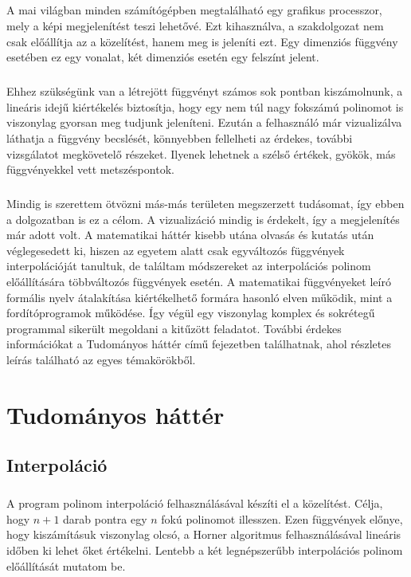 \documentclass{elteikthesis}
\begin{document}
\paragraph{}
A mai világban minden számítógépben megtalálható egy grafikus processzor, mely a képi megjelenítést teszi lehetővé. Ezt kihasználva, a szakdolgozat nem csak előállítja az a közelítést, hanem meg is jeleníti ezt. Egy dimenziós függvény esetében ez egy vonalat, két dimenziós esetén egy felszínt jelent.
\paragraph{}
Ehhez szükségünk van a létrejött függvényt számos sok pontban kiszámolnunk, a lineáris idejű kiértékelés biztosítja, hogy egy nem túl nagy fokszámú polinomot is viszonylag gyorsan meg tudjunk jeleníteni. Ezután a felhasználó már vizualizálva láthatja a függvény becslését, könnyebben fellelheti az érdekes, további vizsgálatot megkövetelő részeket. Ilyenek lehetnek a szélső értékek, gyökök, más függvényekkel vett metszéspontok.
\paragraph{}
Mindig is szerettem ötvözni más-más területen megszerzett tudásomat, így ebben a dolgozatban is ez a célom. A vizualizáció mindig is érdekelt, így a megjelenítés már adott volt. A matematikai háttér kisebb utána olvasás és kutatás után véglegesedett ki, hiszen az egyetem alatt csak egyváltozós függvények interpolációját tanultuk, de találtam módszereket az interpolációs polinom előállítására többváltozós függvények esetén. A matematikai függvényeket leíró formális nyelv átalakítása kiértékelhető formára hasonló elven működik, mint a fordítóprogramok működése. Így végül egy viszonylag komplex és sokrétegű programmal sikerült megoldani a kitűzött feladatot. További érdekes információkat a Tudományos háttér című fejezetben találhatnak, ahol részletes leírás található az egyes témakörökből.

\chapter{Tudományos háttér}
\section{Interpoláció}
\paragraph{}
A program polinom interpoláció felhasználásával készíti el a közelítést. Célja, hogy $n+1$ darab pontra egy $n$ fokú polinomot illesszen. Ezen függvények előnye, hogy kiszámításuk viszonylag olcsó, a Horner algoritmus felhasználásával lineáris időben ki lehet őket értékelni. Lentebb a két legnépszerűbb interpolációs polinom előállítását mutatom be. 
\end{document}

